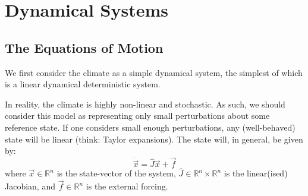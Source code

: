 \chapter{Dynamical Systems}\label{Dynamical Systems}

\section{The Equations of Motion}

We first consider the climate as a simple dynamical system, the simplest of which is a linear dynamical deterministic system.

In reality, the climate is highly non-linear and stochastic. As such, we should consider this model as representing only small perturbations about some reference state. If one considers small enough perturbations, any (well-behaved) state will be linear (think: Taylor expansions). The state will, in general, be given by:
\begin{equation}\label{Dynamical System Eqn}
    \dot{\vec{x}}=\hat{J}\vec{x}+\vec{f}
\end{equation}
where $\vec{x}\in\mathbb{R}^n$ is the state-vector of the system, $\hat{J}\in\mathbb{R}^n\times\mathbb{R}^n$ is the linear(ised) Jacobian, and $\vec{f}\in\mathbb{R}^n$ is the external forcing. 

